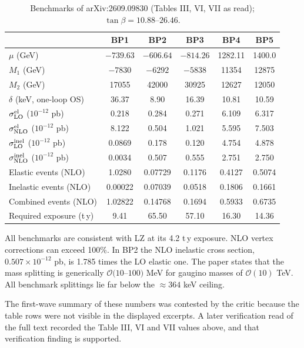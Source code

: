 \documentclass[11pt,a4paper]{article}
\begin{document}
\begin{table}[h]
\centering
\begin{tabular}{lccccc}
\toprule
 & BP1 & BP2 & BP3 & BP4 & BP5\\
\midrule
$\mu$ (GeV) & $-739.63$ & $-606.64$ & $-814.26$ & 1282.11 & 1400.0\\
$M_1$ (GeV) & $-7830$ & $-6292$ & $-5838$ & 11354 & 12875\\
$M_2$ (GeV) & 17055 & 42000 & 30925 & 12627 & 12050\\
$\delta$ (keV, one-loop OS) & 36.37 & 8.90 & 16.39 & 10.81 & 10.59\\
$\sigma^{\rm el}_{\rm LO}$ ($10^{-12}$ pb) & 0.218 & 0.284 & 0.271 & 6.109 & 6.317\\
$\sigma^{\rm el}_{\rm NLO}$ ($10^{-12}$ pb) & 8.122 & 0.504 & 1.021 & 5.595 & 7.503\\
$\sigma^{\rm inel}_{\rm LO}$ ($10^{-12}$ pb) & 0.0869 & 0.178 & 0.120 & 4.754 & 4.878\\
$\sigma^{\rm inel}_{\rm NLO}$ ($10^{-12}$ pb) & 0.0034 & 0.507 & 0.555 & 2.751 & 2.750\\
Elastic events (NLO) & 1.0280 & 0.07729 & 0.1176 & 0.4127 & 0.5074\\
Inelastic events (NLO) & 0.00022 & 0.07039 & 0.0518 & 0.1806 & 0.1661\\
Combined events (NLO) & 1.02822 & 0.14768 & 0.1694 & 0.5933 & 0.6735\\
Required exposure (t\,y) & 9.41 & 65.50 & 57.10 & 16.30 & 14.36\\
\bottomrule
\end{tabular}
\caption{Benchmarks of arXiv:2609.09830 (Tables III, VI, VII as read); $\tan\beta = 10.88$--$26.46$.}
\label{tab:bp}
\end{table}

All benchmarks are consistent with LZ at its 4.2 t\,y exposure. NLO vertex corrections can exceed 100\%. In BP2 the NLO inelastic cross section, $0.507\times10^{-12}$ pb, is 1.785 times the LO elastic one. The paper states that the mass splitting is generically $\mathcal{O}(10$--$100)$ MeV for gaugino masses of $\mathcal{O}(10)$ TeV. All benchmark splittings lie far below the $\approx 364$ keV ceiling.

The first-wave summary of these numbers was contested by the critic because the table rows were not visible in the displayed excerpts. A later verification read of the full text recorded the Table III, VI and VII values above, and that verification finding is supported.
\end{document}
